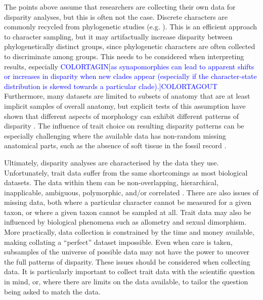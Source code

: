 \documentclass[12pt,letterpaper]{article}
\begin{document}
The points above assume that researchers are collecting their own data for disparity analyses, but this is often not the case.
Discrete characters are commonly recycled from phylogenetic studies (e.g. \citealt{Brusatte2008,Close2015}).
This is an efficient approach to character sampling, but it may artifactually increase disparity between phylogenetically distinct groups, since phylogenetic characters are often collected to discriminate among groups.
This needs to be considered when interpreting results, especially \textcolor{blue}{COLORTAGIN[as synapomorphies can lead to apparent shifts or increases in disparity when new clades appear (especially if the character-state distribution is skewed towards a particular clade).]COLORTAGOUT}
Furthermore, many datasets are limited to subsets of anatomy that are at least implicit samples of overall anatomy, but explicit tests of this assumption have shown that different aspects of morphology can exhibit different patterns of disparity \citep{Hopkins2017}.
The influence of trait choice on resulting disparity patterns can be especially challenging where the available data has non-random missing anatomical parts, such as the absence of soft tissue in the fossil record \citep{Deline2018}.

Ultimately, disparity analyses are characterised by the data they use. Unfortunately, trait data suffer from the same shortcomings as most biological datasets. The data within them can be non-overlapping, hierarchical, inapplicable, ambiguous, polymorphic, and/or correlated \citep{Palci2018}. There are also issues of missing data, both where a particular character cannot be measured for a given taxon, or where a given taxon cannot be sampled at all. Trait data may also be influenced by biological phenomena such as allometry and sexual dimorphism. More practically, data collection is constrained by the time and money available, making collating a ``perfect'' dataset impossible. Even when care is taken, subsamples of the universe of possible data may not have the power to uncover the full patterns of disparity. These issues should be considered when collecting data. It is particularly important to collect trait data with the scientific question in mind, or, where there are limits on the data available, to tailor the question being asked to match the data. 
\end{document}
